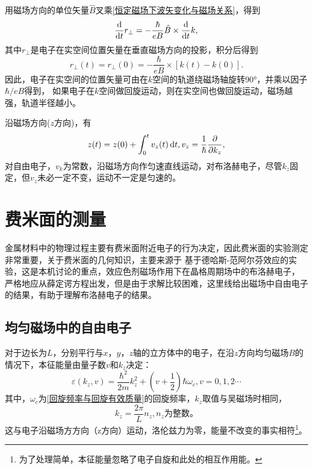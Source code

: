             用磁场方向的单位矢量$\hat{B}$叉乘\autoref{恒定磁场下波矢变化与磁场关系}，得到
            \begin{equation}
                \frac{\mathop{}\!\mathrm{d}}{\mathop{}\!\mathrm{d} t}r_\perp=-\frac{\hbar}{eB}\hat{B}\times\frac{\mathop{}\!\mathrm{d} }{\mathop{}\!\mathrm{d} t}k,
            \end{equation}
            其中$r_\perp$是电子在实空间位置矢量在垂直磁场方向的投影，积分后得到
            \begin{equation}
                r_\perp(t)=r_\perp(0)=-\frac{\hbar}{eB}\times[k(t)-k(0)].
            \end{equation}
            因此，电子在实空间的位置矢量可由在$k$空间的轨道绕磁场轴旋转\ang{90}，并乘以因子$\hbar/eB$得到，
            如果电子在$k$空间做回旋运动，则在实空间也做回旋运动，磁场越强，轨道半径越小。

            沿磁场方向($z$方向)，有
            \begin{equation}
                z(t)=z(0)+\int_{0}^{t}v_z(t)\mathop{}\!\mathrm{d} t, v_z=\frac{1}{\hbar}\frac{\partial}{\partial k_z},
            \end{equation}
            对自由电子，$v_k$为常数，沿磁场方向作匀速直线运动，对布洛赫电子，尽管$k_z$固定，但$v_z$未必一定不变，运动不一定是匀速的。
        
    \section{费米面的测量}
        金属材料中的物理过程主要有费米面附近电子的行为决定，因此费米面的实验测定非常重要，关于费米面的几何知识，主要来源于
        基于德哈斯-范阿尔芬效应的实验，这是本机讨论的重点，效应色剂磁场作用下在晶格周期场中的布洛赫电子，
        严格地应从薛定谔方程出发，但是由于求解比较困难，这里线给出磁场中自由电子的结果，有助于理解布洛赫电子的结果。
        \subsection{均匀磁场中的自由电子}
            对于边长为$L$，分别平行与$x$，$y$，$z$轴的立方体中的电子，在沿$z$方向均匀磁场$B$的情况下，本征能量由量子数$v$和$k_z$决定：
            \begin{equation}
                \varepsilon(k_z,v)=\frac{\hbar^2}{2m}k_z^2+\left( v+\frac{1}{2} \right)\hbar\omega_c, v=0,1,2\cdots\label{均匀磁场下电子运动的本征值}
            \end{equation}
            其中，$\omega_c$为\autoref{回旋频率与回旋有效质量}的回旋频率，$k_z$取值与吴磁场时相同，
            \begin{equation}
                k_z=\frac{2\pi}{L}n_z, n_z\text{为整数。}
            \end{equation}
            这与电子沿磁场方方向（z方向）运动，洛伦兹力为零，能量不改变的事实相符\footnote{为了处理简单，本征能量忽略了电子自旋和此处的相互作用能。}。


